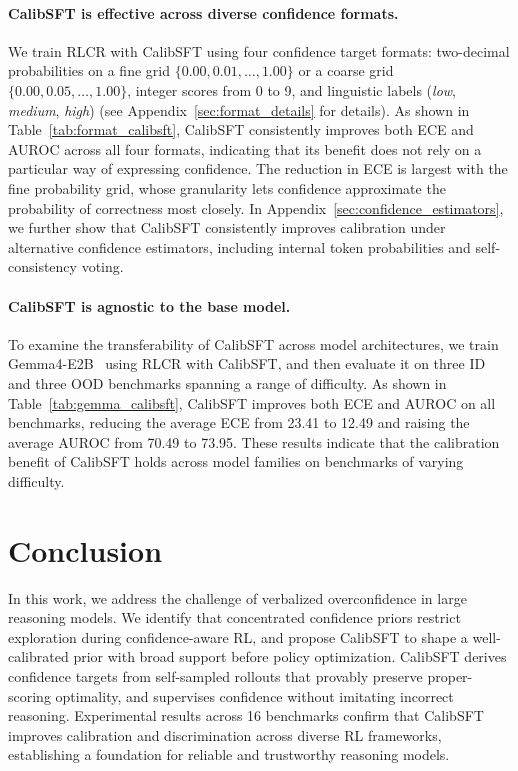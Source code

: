 \documentclass{article} %
\begin{document}
\paragraph{CalibSFT is effective across diverse confidence formats.}
We train RLCR with CalibSFT using four confidence target formats: two-decimal probabilities on a fine grid $\{0.00, 0.01, \ldots, 1.00\}$ or a coarse grid $\{0.00, 0.05, \ldots, 1.00\}$, integer scores from 0 to 9, and linguistic labels (\emph{low}, \emph{medium}, \emph{high}) (see Appendix~\ref{sec:format_details} for details).
As shown in Table~\ref{tab:format_calibsft}, CalibSFT consistently improves both ECE and AUROC across all four formats, indicating that its benefit does not rely on a particular way of expressing confidence. 
The reduction in ECE is largest with the fine probability grid, whose granularity lets confidence approximate the probability of correctness most closely.
In Appendix~\ref{sec:confidence_estimators}, we further show that CalibSFT consistently improves calibration under alternative confidence estimators, including internal token probabilities and self-consistency voting.

\paragraph{CalibSFT is agnostic to the base model.}
To examine the transferability of CalibSFT across model architectures, we train Gemma4-E2B~\citep{team2026gemma} using RLCR with CalibSFT, and then evaluate it on three ID and three OOD benchmarks spanning a range of difficulty. 
As shown in Table~\ref{tab:gemma_calibsft}, CalibSFT improves both ECE and AUROC on all benchmarks, reducing the average ECE from 23.41 to 12.49 and raising the average AUROC from 70.49 to 73.95. 
These results indicate that the calibration benefit of CalibSFT holds across model families on benchmarks of varying difficulty.


\section{Conclusion}

In this work, we address the challenge of verbalized overconfidence in large reasoning models.
We identify that concentrated confidence priors restrict exploration during confidence-aware RL, 
and propose CalibSFT to shape a well-calibrated prior with broad support before policy optimization. 
CalibSFT derives confidence targets from self-sampled rollouts that provably preserve proper-scoring optimality, and supervises confidence without imitating incorrect reasoning.
Experimental results across 16 benchmarks confirm that CalibSFT improves calibration and discrimination across diverse RL frameworks, establishing a foundation for reliable and trustworthy reasoning models.
\end{document}
